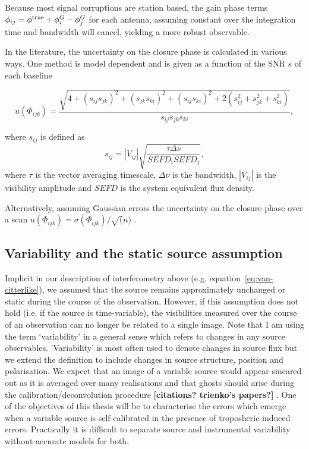 \noindent Because most signal corruptions are station based, the gain phase terms $\phi_{ij}=\phi^{\rm true}+ \phi^G_i -\phi^G_j$ for each antenna, assuming constant over the integration time and bandwidth will cancel, yielding a more robust observable.  

In the literature, the uncertainty on the closure phase is calculated in various ways. One method is model dependent \citep{Rogers_1995} and is given as a function of the SNR $s$ of each baseline 

\begin{equation}\label{eq:ucp}
u(\Phi_{ijk}) = \frac{\sqrt{4 + (s_{ij}s_{jk})^2 + (s_{jk}s_{ki})^2 + (s_{ij}s_{ki})^2 +
                        2(s_{ij}^2+s_{jk}^2+s_{ki}^2)}}{s_{ij}s_{jk}s_{ki}},
\end{equation}

\noindent where $s_{ij}$ is defined as
\begin{equation}
s_{ij}=|V_{ij}| \sqrt{\frac{ \tau \Delta \nu}{SEFD_i SEFD_j}},
\end{equation}
where $\tau$ is the vector averaging timescale, $\Delta \nu$ is the bandwidth, $|V_{ij}|$ is the visibility amplitude and $SEFD$ is the system equivalent flux density.

Alternatively, assuming Gaussian errors the uncertainty on the closure phase over a scan $u(\Phi_{ijk})=\sigma(\Phi_{ijk})/\sqrt(n)$  \citep{Brinkerink_2016}.

\subsection{Variability and the static source assumption}\label{sec:variability}

Implicit in our description of interferometry above (e.g. equation~\ref{eq:van-citterlike}), we assumed that the source remains approximately unchanged or static during the course of the observation. However, if this assumption does not hold (i.e. if the source is time-variable), the visibilities measured over the course of an observation can no longer be related to a single image.
Note that I am using the term `variability' in a general sense which refers to changes in any source observables. 'Variability' is most often used to denote changes in source flux but we extend the definition to include changes in source structure, position and polarisation.
We expect that an image of a variable source would appear smeared out as it is averaged over many realisations and that ghosts should arise during the calibration/deconvolution procedure {\bf [citations? trienko's papers?]} . One of the objectives of this thesis will be to characterise the errors which emerge when a variable source is self-calibrated in the presence of troposheric-induced errors. Practically it is difficult to separate source and instrumental variability without accurate models for both. 


